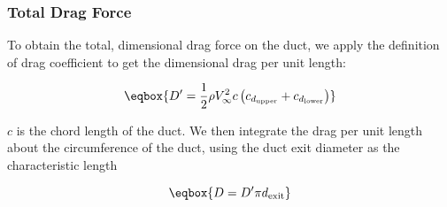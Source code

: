 %

\subsubsection{Total Drag Force}

To obtain the total, dimensional drag force on the duct, we apply the definition of drag coefficient to get the dimensional drag per unit length:

\begin{equation}
    \eqbox{
    D' = \frac{1}{2} \rho V_\infty^2 c \left(c_{d_\text{upper}} + c_{d_\text{lower}}\right)
}
\end{equation}

\where \(c\) is the chord length of the duct.
%
We then integrate the drag per unit length about the circumference of the duct, using the duct exit diameter as the characteristic length

\begin{equation}
    \eqbox{
    D = D' \pi d_\text{exit}
}
\end{equation}



